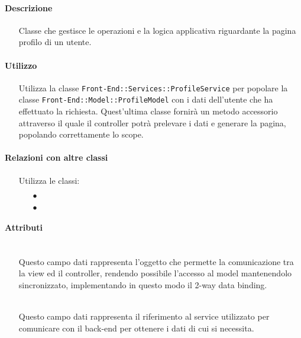 \paragraph*{Descrizione}
\begin{itemize}
\item[] Classe che gestisce le operazioni e la logica applicativa riguardante la pagina profilo di un utente.
\end{itemize}

\paragraph*{Utilizzo}
\begin{itemize}
\item[] Utilizza la classe \texttt{Front-End::Services::ProfileService} per popolare la classe \texttt{Front-End::Model::ProfileModel} con i dati dell'utente che ha effettuato la richiesta. Quest'ultima classe fornirà un metodo accessorio attraverso il quale il controller potrà prelevare i dati e generare la pagina, popolando correttamente lo scope.
\end{itemize}

\paragraph*{Relazioni con altre classi}
\begin{itemize}


\item[] Utilizza le classi:
\begin{itemize}
\item[$\bullet$] 
\item[$\bullet$] 
\end{itemize}
\end{itemize}

\paragraph*{Attributi}
\begin{itemize}
\item[]  \\ Questo campo dati rappresenta l'oggetto che permette la comunicazione tra la view ed il controller, rendendo possibile l’accesso al model mantenendolo sincronizzato, implementando in questo modo il 2-way data binding.
\item[]  \\ Questo campo dati rappresenta il riferimento al service utilizzato per comunicare con il back-end per ottenere i dati di cui si necessita.
\end{itemize}


